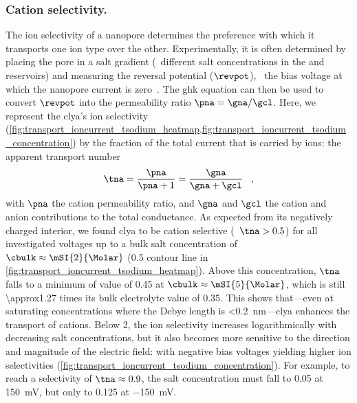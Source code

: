 \subsubsection{Cation selectivity.}
%
The ion selectivity of a nanopore determines the preference with which it transports one ion type over the
other. Experimentally, it is often determined by placing the pore in a salt gradient (\ie~different salt
concentrations in the \cisi{} and \transi{} reservoirs) and measuring the reversal potential ($\revpot$),
\ie~the bias voltage at which the nanopore current is zero~\cite{Soskine-2013,Franceschini-2016}. The
\gls{ghk} equation can then be used to convert $\revpot$ into the permeability ratio $\pna = \gna / \gcl$.
Here, we represent the \gls{clya}'s ion selectivity
%
(\cref{fig:transport_ioncurrent_tsodium_heatmap,fig:transport_ioncurrent_tsodium_concentration}) 
%
by the fraction of the total current that is carried by \Na{} ions: the apparent \Na{} transport number
%
\begin{align}\label{eq:tna}
  \tna = \dfrac{\pna}{\pna + 1} = \dfrac{\gna}{\gna + \gcl}
  \text{ \, ,}
\end{align}
%
with $\pna$ the cation permeability ratio, and $\gna$ and $\gcl$ the cation and anion contributions to the
total conductance. As expected from its negatively charged interior, we found \gls{clya} to be cation
selective (\ie~$\tna > 0.5$) for all investigated voltages up to a bulk salt concentration of $\cbulk \approx
\mSI{2}{\Molar}$  (0.5 contour line in \cref{fig:transport_ioncurrent_tsodium_heatmap}). Above this
concentration, $\tna$ falls to a minimum of value of 0.45 at $\cbulk\approx\mSI{5}{\Molar}$, which is still
\num{\approx1.27} times its bulk electrolyte value of 0.35. This shows that---even at saturating
concentrations where the Debye length is \SI{<0.2}{\nm}---\gls{clya} enhances the transport of cations. Below
\SI{2}{\Molar}, the ion selectivity increases logarithmically with decreasing salt concentrations, but it also
becomes more sensitive to the direction and magnitude of the electric field:  with negative bias voltages
yielding higher ion selectivities (\cref{fig:transport_ioncurrent_tsodium_concentration}). For example, to
reach a selectivity of $\tna \approx 0.9$, the salt concentration must fall to \SI{0.05}{\Molar} at
\SI{+150}{\mV}, but only to \SI{0.125}{\Molar} at \SI{-150}{\mV}.

